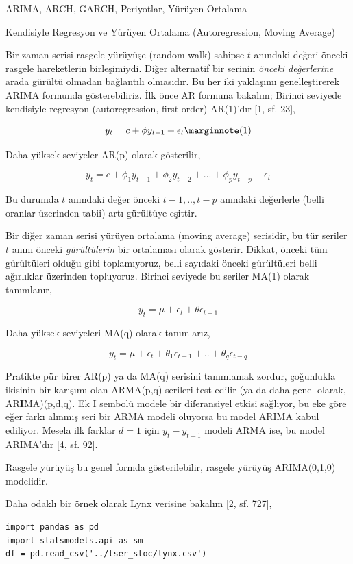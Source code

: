 \documentclass[12pt,fleqn]{article}\usepackage{../../common}
\begin{document}
ARIMA, ARCH, GARCH, Periyotlar, Yürüyen Ortalama

Kendisiyle Regresyon ve Yürüyen Ortalama (Autoregression, Moving Average)

Bir zaman serisi rasgele yürüyüşe (random walk) sahipse $t$ anındaki değeri
önceki rasgele hareketlerin birleşimiydi. Diğer alternatif bir serinin {\em
  önceki değerlerine} arada gürültü olmadan bağlantılı olmasıdır. Bu her iki
yaklaşımı genelleştirerek ARIMA formunda gösterebiliriz. İlk önce AR formuna
bakalım; Birinci seviyede kendisiyle regresyon (autoregression, first order)
AR(1)'dır [1, sf. 23],

$$ 
y_t = c + \phi y_{t-1} + \epsilon_t  
\mlabel{1} 
$$

Daha yüksek seviyeler AR(p) olarak gösterilir, 

$$ y_t = c + \phi_1 y_{t-1} +  \phi_2 y_{t-2} + ... +  \phi_p y_{t-p}  + \epsilon_t  $$

Bu durumda $t$ anındaki değer önceki $t-1,..,t-p$ anındaki değerlerle
(belli oranlar üzerinden tabii) artı gürültüye eşittir.

Bir diğer zaman serisi yürüyen ortalama (moving average) serisidir, bu
tür seriler $t$ anını önceki {\em gürültülerin} bir ortalaması olarak
gösterir. Dikkat, önceki tüm gürültüleri olduğu gibi toplamıyoruz, belli
sayıdaki önceki gürültüleri belli ağırlıklar üzerinden topluyoruz. Birinci
seviyede bu seriler MA(1) olarak tanımlanır,

$$ y_t = \mu + \epsilon_t + \theta \epsilon_{t-1} $$

Daha yüksek seviyeleri MA(q) olarak tanımlarız, 

$$ y_t = \mu + \epsilon_t + \theta_1 \epsilon_{t-1} + .. + \theta_q \epsilon_{t-q} $$

Pratikte pür birer AR(p) ya da MA(q) serisini tanımlamak zordur, çoğunlukla
ikisinin bir karışımı olan ARMA(p,q) serileri test edilir (ya da daha genel
olarak, AR\textbf{I}MA)(p,d,q). Ek I sembolü modele bir diferansiyel etkisi
sağlıyor, bu eke göre eğer farkı alınmış seri bir ARMA modeli oluyorsa bu
model ARIMA kabul ediliyor. Mesela ilk farklar $d=1$ için $y_t - y_{t-1}$
modeli ARMA ise, bu model ARIMA'dır [4, sf. 92].

Rasgele yürüyüş bu genel formda gösterilebilir, rasgele yürüyüş
ARIMA(0,1,0) modelidir. 

Daha odaklı bir örnek olarak Lynx verisine bakalım [2, sf. 727],

\begin{verbatim}
import pandas as pd
import statsmodels.api as sm
df = pd.read_csv('../tser_stoc/lynx.csv')
\end{verbatim}
\end{document}
